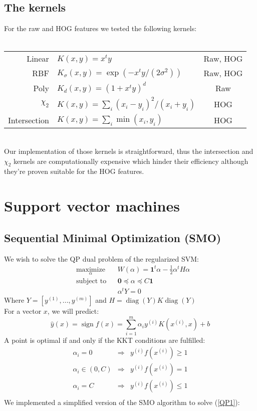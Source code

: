\documentclass{acmsiggraph}
\DeclareMathOperator\sign{sign}
\DeclareMathOperator\diag{diag}
\newcommand{\1}{\mathbf{1}}
\newcommand{\0}{\mathbf{0}}
\begin{document}
\subsection{The kernels}
For the raw and HOG features we tested the following kernels:\\
\vspace{5pt}\\
\begin{tabular}{r|l ||c}
Linear & $K(x,y)=x^ty$ & Raw, HOG\\
RBF & $K_\sigma(x,y) = \exp(-x^ty/(2\sigma^2))$ & Raw, HOG\\
Poly & $K_d(x,y) = (1+x^ty)^d$ & Raw\\
$\chi_2$ & $K(x,y) = \sum_i(x_i-y_i)^2/(x_i+y_i)$ & HOG\\
Intersection & $K(x,y) = \sum_i\min(x_i,y_i)$ & HOG\\
\end{tabular}
\vspace{10pt}\\
Our implementation of those kernels is straightforward, thus the intersection and $\chi_2$ kernels are computationally expensive which hinder their efficiency although they're proven suitable for the HOG features.

\section{Support vector machines}
\subsection{Sequential Minimal Optimization (SMO)}
We wish to solve the QP dual problem of the regularized SVM:
\begin{equation}
\label{QP1}
\tag{QP1}
\begin{aligned}
& \underset{\alpha}{\text{maximize}} & & W(\alpha) = \1^t\alpha - \frac{1}{2}\alpha^tH\alpha\\
& \text{subject to} & & \0\preceq \alpha \preceq C\1\\
& & & \alpha^tY = 0
\end{aligned}
\end{equation}
Where $Y = [y^{(1)},...,y^{(m)}]$ and $H = \diag(Y)K \diag(Y)$\\
For a vector $x$, we will predict:
\[\hat y(x) = \sign f(x) = \sum_{i=1}^m\alpha_iy^{(i)}K(x^{(i)},x)+b\]
A point is optimal if and only if the KKT conditions are fulfilled:
\begin{equation}
\begin{aligned}
\alpha_i=0&\Rightarrow &y^{(i)} f(x^{(i)}) \geq 1\\
\alpha_i\in (0,C)&\Rightarrow& y^{(i)} f(x^{(i)}) = 1\\
\alpha_i=C&\Rightarrow &y^{(i)} f(x^{(i)}) \leq 1\\
\end{aligned}
\tag{KKT}
\label{KKT}
\end{equation}
We implemented a simplified version of the SMO algorithm to solve (\ref{QP1}):\\
\end{document}
